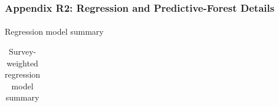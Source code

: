 \documentclass[
  11pt,
  a4paper,
]{article}
\makeatletter
\let\oldparagraph\paragraph
\renewcommand{\paragraph}{
    \@ifstar
      \xxxParagraphStar
      \xxxParagraphNoStar
  }
\newcommand{\xxxParagraphStar}[1]{\oldparagraph*{#1}\mbox{}}
\newcommand{\xxxParagraphNoStar}[1]{\oldparagraph{#1}\mbox{}}
\makeatother
\begin{document}
\subsubsection{Appendix R2: Regression and Predictive-Forest
Details}\label{appendix-r2-regression-and-predictive-forest-details}

\paragraph{Regression model summary}\label{regression-model-summary}

\begingroup\fontsize{11}{13}\selectfont

\begin{longtable}[t]{>{\raggedright\arraybackslash}p{4.5cm}rrrlrr}

\caption{\label{tbl-appendix-regression-model-summary}Survey-weighted
regression model summary}

\tabularnewline


\end{longtable}
\end{document}
